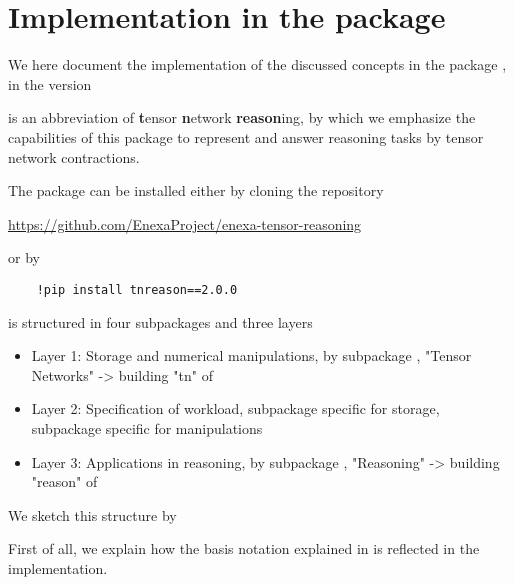 \chapter{Implementation in the \tnreason package}\label{cha:implementation}

We here document the implementation of the discussed concepts in the \python package \tnreason, in the version \curvertnreason

\tnreason is an abbreviation of \textbf{t}ensor \textbf{n}etwork \textbf{reason}ing, by which we emphasize the capabilities of this package to represent and answer reasoning tasks by tensor network contractions.

The package can be installed either by cloning the repository
\begin{center}
    \href{https://github.com/EnexaProject/enexa-tensor-reasoning}{https://github.com/EnexaProject/enexa-tensor-reasoning}
\end{center}
or by
\begin{lstlisting}
	!pip install tnreason==2.0.0
\end{lstlisting}


\tnreason is structured in four subpackages and three layers
\begin{itemize}
    \item Layer 1: Storage and numerical manipulations, by subpackage \spengine, "Tensor Networks" -> building "tn" of \tnreason
    \item Layer 2: Specification of workload, subpackage \sprepresentation specific for storage, subpackage \spreasoning specific for manipulations
    \item Layer 3: Applications in reasoning, by subpackage \spapplication, "Reasoning" -> building "reason" of \tnreason
\end{itemize}

We sketch this structure by
\begin{center}
    
\end{center}



First of all, we explain how the basis notation explained in  is reflected in the implementation.

